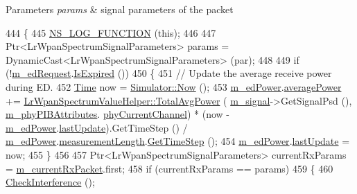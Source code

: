 \begin{DoxyParams}{Parameters}
{\em params} & signal parameters of the packet \\
\hline
\end{DoxyParams}

\begin{DoxyCode}
444 \{
445   \hyperlink{log-macros-disabled_8h_a90b90d5bad1f39cb1b64923ea94c0761}{NS\_LOG\_FUNCTION} (\textcolor{keyword}{this});
446 
447   Ptr<LrWpanSpectrumSignalParameters> params = DynamicCast<LrWpanSpectrumSignalParameters> (par);
448 
449   \textcolor{keywordflow}{if} (!\hyperlink{classns3_1_1LrWpanPhy_a7de5c9c2ff7a6797ef475fb030e99ad0}{m\_edRequest}.\hyperlink{classns3_1_1EventId_a5c30c92e7c1c34b4e8505cc07ed71b02}{IsExpired} ())
450     \{
451       \textcolor{comment}{// Update the average receive power during ED.}
452       \hyperlink{namespacens3_1_1TracedValueCallback_a7ffd3e7c142ffe7c8a1d2db9b8de38ec}{Time} now = \hyperlink{classns3_1_1Simulator_ac3178fa975b419f7875e7105be122800}{Simulator::Now} ();
453       \hyperlink{classns3_1_1LrWpanPhy_a63a7ca8192b16aa1d4ea320c1a43452f}{m\_edPower}.\hyperlink{structns3_1_1LrWpanEdPower_a1c454915534c342f9706e6e42006b388}{averagePower} += 
      \hyperlink{classns3_1_1LrWpanSpectrumValueHelper_ab8f05acfb68822f7b94fc637311fbda6}{LrWpanSpectrumValueHelper::TotalAvgPower} (
      \hyperlink{classns3_1_1LrWpanPhy_a923130b0bacef678012bcc8fdc68fd10}{m\_signal}->GetSignalPsd (), \hyperlink{classns3_1_1LrWpanPhy_a7f263bedbdeed627f7c5f2dab8e960c8}{m\_phyPIBAttributes}.
      \hyperlink{structns3_1_1LrWpanPhyPibAttributes_a8e620dfd0f5b45fa6c9525d93c498fcb}{phyCurrentChannel}) * (now - \hyperlink{classns3_1_1LrWpanPhy_a63a7ca8192b16aa1d4ea320c1a43452f}{m\_edPower}.\hyperlink{structns3_1_1LrWpanEdPower_ac652b200f53980a1632776b9ee2c8456}{lastUpdate}).GetTimeStep () / 
      \hyperlink{classns3_1_1LrWpanPhy_a63a7ca8192b16aa1d4ea320c1a43452f}{m\_edPower}.\hyperlink{structns3_1_1LrWpanEdPower_ad0843da1bc59c22ff31bbd2023f61dc0}{measurementLength}.\hyperlink{classns3_1_1Time_a40a7025b73dac7d02f8a4e1e54eaa5b5}{GetTimeStep} ();
454       \hyperlink{classns3_1_1LrWpanPhy_a63a7ca8192b16aa1d4ea320c1a43452f}{m\_edPower}.\hyperlink{structns3_1_1LrWpanEdPower_ac652b200f53980a1632776b9ee2c8456}{lastUpdate} = now;
455     \}
456 
457   Ptr<LrWpanSpectrumSignalParameters> currentRxParams = \hyperlink{classns3_1_1LrWpanPhy_a5e25bc6b183652edc17015d04cca92a3}{m\_currentRxPacket}.first;
458   \textcolor{keywordflow}{if} (currentRxParams == params)
459     \{
460       \hyperlink{classns3_1_1LrWpanPhy_a8a339fadde6f27b6a495377a4eca7943}{CheckInterference} ();

\end{DoxyCode}
